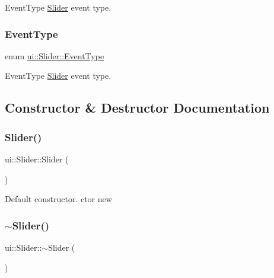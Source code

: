 Event\+Type \hyperlink{classui_1_1Slider}{Slider} event type. \mbox{\label{classui_1_1Slider_aaaaec31aa46f491595d338978033c267}} 
\subsubsection{\texorpdfstring{Event\+Type}{EventType}\hspace{0.1cm}{\footnotesize\ttfamily [2/2]}}
{\footnotesize\ttfamily enum \hyperlink{classui_1_1Slider_aaaaec31aa46f491595d338978033c267}{ui\+::\+Slider\+::\+Event\+Type}\hspace{0.3cm}{\ttfamily [strong]}}

Event\+Type \hyperlink{classui_1_1Slider}{Slider} event type. 

\subsection{Constructor \& Destructor Documentation}
\mbox{\label{classui_1_1Slider_ac4d871719e4de62907d10551f34a36f3}} 
\subsubsection{\texorpdfstring{Slider()}{Slider()}\hspace{0.1cm}{\footnotesize\ttfamily [1/2]}}
{\footnotesize\ttfamily ui\+::\+Slider\+::\+Slider (\begin{DoxyParamCaption}{ }\end{DoxyParamCaption})}

Default constructor.  ctor  new \mbox{\label{classui_1_1Slider_accf68561bf70429ba8b528c5ebc7bc1f}} 
\subsubsection{\texorpdfstring{$\sim$\+Slider()}{~Slider()}\hspace{0.1cm}{\footnotesize\ttfamily [1/2]}}
{\footnotesize\ttfamily ui\+::\+Slider\+::$\sim$\+Slider (\begin{DoxyParamCaption}{ }\end{DoxyParamCaption})\hspace{0.3cm}{\ttfamily [virtual]}}

